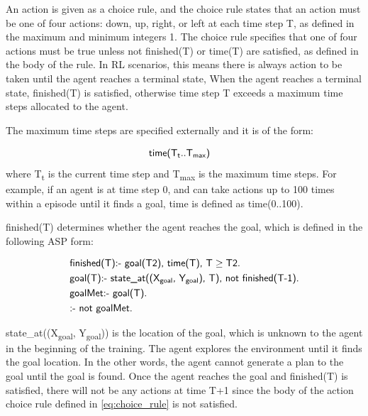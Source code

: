 An action is given as a choice rule, and the choice rule states that an action must be one of four actions: \textsf{down}, \textsf{up}, \textsf{right}, or \textsf{left}
at each time step T, as defined in the maximum and minimum integers 1.
The choice rule specifies that one of four actions must be true unless \textsf{not finished(T)} or \textsf{time(T)} are satisfied, as defined in the body of the rule.
In RL scenarios, this means there is always action to be taken until the agent reaches a terminal state, 
When the agent reaches a terminal state, \textsf{finished(T)} is satisfied, otherwise time step T exceeds a maximum time steps allocated to the agent.

The maximum time steps are specified externally and it is of the form:

\begin{equation}
\begin{split}
&\textsf{time(T\textsubscript{t}..T\textsubscript{max})}
\end{split}
\end{equation}
where T\textsubscript{t} is the current time step and T\textsubscript{max} is the maximum time steps.
For example, if an agent is at time step 0, and can take actions up to 100 times within a episode until it finds a goal, \textsf{time} is defined as \textsf{time(0..100)}.

\textsf{finished(T)} determines whether the agent reaches the goal, which is defined in the following ASP form:

\begin{equation}\label{eq:asp_goal}
\begin{split}
&\textsf{finished(T):- goal(T2), time(T), T} \geq \textsf{T2.}\\
&\textsf{goal(T):- state\_at((X\textsubscript{goal}, Y\textsubscript{goal}), T), not finished(T-1).}\\
&\textsf{goalMet:- goal(T).}\\
&\textsf{:- not goalMet.}
\end{split}
\end{equation}

\textsf{state\_at((X\textsubscript{goal}, Y\textsubscript{goal}))} is the location of the goal, which is unknown to the agent in the beginning of the training.
The agent explores the environment until it finds the goal location.
In the other words, the agent cannot generate a plan to the goal until the goal is found. 
Once the agent reaches the goal and \textsf{finished(T)} is satisfied, 
there will not be any actions at time T+1 since the body of the action choice rule defined in \ref{eq:choice_rule} is not satisfied.

